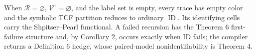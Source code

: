 When \(\mathcal R=\varnothing\), \(\mathcal V^{\dagger}=\varnothing\), and the label set is empty, every trace has empty color and the symbolic TCF partition reduces to ordinary \(\operatorname{ID}\). Its identifying cells carry the Shpitser--Pearl functional. A failed recursion has the Theorem 6 first-failure structure and, by Corollary 2, occurs exactly when ID fails; the compiler returns a Definition 6 hedge, whose paired-model nonidentifiability is Theorem 4.